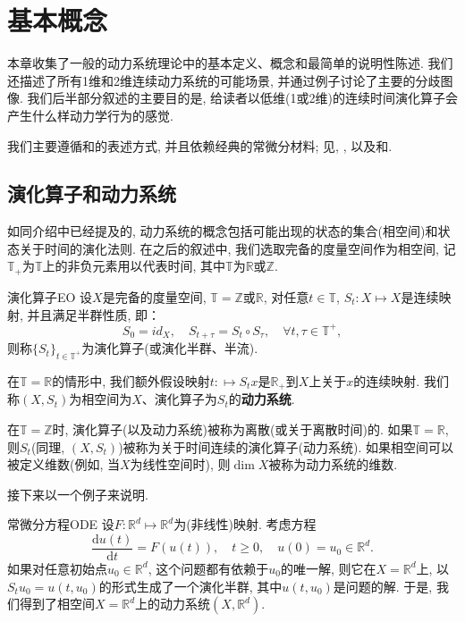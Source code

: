 \chapter{基本概念}\label{cpt:1}

本章收集了一般的动力系统理论中的基本定义、概念和最简单的说明性陈述. 我们还描述了所有1维和2维连续动力系统的可能场景, 并通过例子讨论了主要的分歧图像. 我们后半部分叙述的主要目的是, 给读者以低维(1或2维)的连续时间演化算子会产生什么样动力学行为的感觉.

我们主要遵循\cite{Nemytskii60}和\cite{Sibirsky75}的表述方式, 并且依赖经典的常微分材料; 见\cite{Coddington55}, \cite{Hartman02}, \cite{Lefschetz77}以及\cite{Bautin90}和\cite{Reissing74}.

\section{演化算子和动力系统}
如同介绍中已经提及的, 动力系统的概念包括可能出现的状态的集合(相空间)和状态关于时间的演化法则. 在之后的叙述中, 我们选取完备的度量空间作为相空间, 记$\mathbb{T}_{+}$为$\mathbb{T}$上的非负元素用以代表时间, 其中$\mathbb{T}$为$\mathbb{R}$或$\mathbb{Z}$.

\begin{definition}{演化算子}{EO}
	设$X$是完备的度量空间, $\mathbb{T}=\mathbb{Z}$或$\mathbb{R}$, 对任意$t\in\mathbb{T}$, $S_{t}:X\mapsto X$是连续映射, 并且满足半群性质, 即：$$S_{0}=id_{X},\quad S_{t+\tau}=S_{t}\circ S_{\tau},\quad\forall t,\tau\in\mathbb{T}^{+},$$则称$\{S_{t}\}_{t\in \mathbb{T}^{+}}$为演化算子(或演化半群、半流). 
\end{definition}

在$\mathbb{T}=\mathbb{R}$的情形中, 我们额外假设映射$t:\mapsto S_{t}x$是$\mathbb{R}_{+}$到$X$上关于$x$的连续映射.  我们称$(X,S_{t})$为相空间为$X$、演化算子为$S_{t}$的\textbf{动力系统}. 

在$\mathbb{T}=\mathbb{Z}$时, 演化算子(以及动力系统)被称为离散(或关于离散时间)的.  如果$\mathbb{T}=\mathbb{R}$, 则$S_{t}$(同理, $(X,S_{t})$)被称为关于时间连续的演化算子(动力系统). 如果相空间可以被定义维数(例如, 当$X$为线性空间时), 则$\dim X$被称为动力系统的维数. 

接下来以一个例子来说明. 

\begin{example}{常微分方程}{ODE}
	设$F:\mathbb{R}^{d}\mapsto\mathbb{R}^{d}$为(非线性)映射. 考虑方程
	\begin{equation}\label{equ:exa1}
		\frac{\mathrm{d}u(t)}{\mathrm{d}t}=F(u(t)),\quad t\geqslant 0,\quad u(0)=u_{0}\in\mathbb{R}^{d}.
	\end{equation}
	如果对任意初始点$u_{0}\in\mathbb{R}^{d}$, 这个问题都有依赖于$u_{0}$的唯一解, 则它在$X=\mathbb{R}^{d}$上, 以$S_{t}u_{0}=u(t,u_{0})$的形式生成了一个演化半群, 其中$u(t,u_{0})$是问题的解. 于是, 我们得到了相空间$X=\mathbb{R}^{d}$上的动力系统$(X,\mathbb{R}^{d})$. 
\end{example}

